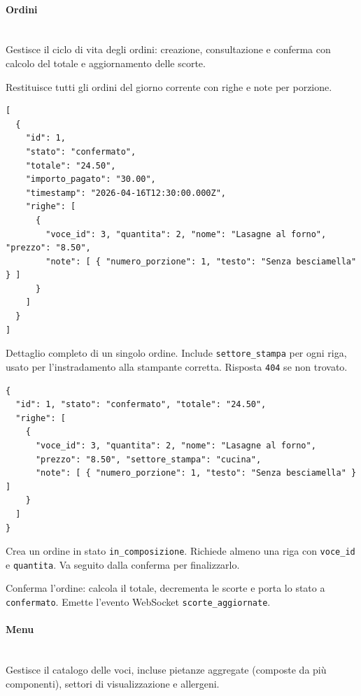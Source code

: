 % 
\paragraph{Ordini}\mbox{}\\
Gestisce il ciclo di vita degli ordini: creazione, consultazione e conferma con calcolo del totale e aggiornamento delle scorte.

Restituisce tutti gli ordini del giorno corrente con righe e note per porzione.

\begin{lstlisting}[style=json]
[
  {
    "id": 1,
    "stato": "confermato",
    "totale": "24.50",
    "importo_pagato": "30.00",
    "timestamp": "2026-04-16T12:30:00.000Z",
    "righe": [
      {
        "voce_id": 3, "quantita": 2, "nome": "Lasagne al forno", "prezzo": "8.50",
        "note": [ { "numero_porzione": 1, "testo": "Senza besciamella" } ]
      }
    ]
  }
]
\end{lstlisting}

Dettaglio completo di un singolo ordine. Include \texttt{settore\_stampa} per ogni riga, usato per l'instradamento alla stampante corretta. Risposta \texttt{404} se non trovato.

\begin{lstlisting}[style=json]
{
  "id": 1, "stato": "confermato", "totale": "24.50",
  "righe": [
    {
      "voce_id": 3, "quantita": 2, "nome": "Lasagne al forno",
      "prezzo": "8.50", "settore_stampa": "cucina",
      "note": [ { "numero_porzione": 1, "testo": "Senza besciamella" } ]
    }
  ]
}
\end{lstlisting}

Crea un ordine in stato \texttt{in\_composizione}. Richiede almeno una riga con \texttt{voce\_id} e \texttt{quantita}. Va seguito dalla conferma per finalizzarlo.


Conferma l'ordine: calcola il totale, decrementa le scorte e porta lo stato a \texttt{confermato}. Emette l'evento WebSocket \texttt{scorte\_aggiornate}.


% 
\paragraph{Menu}\mbox{}\\
Gestisce il catalogo delle voci, incluse pietanze aggregate (composte da più componenti), settori di visualizzazione e allergeni.

